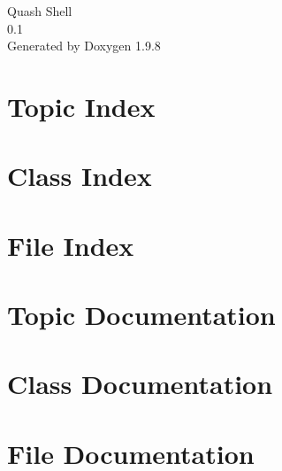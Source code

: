 \documentclass[twoside]{book}
\newcommand{\+}{\discretionary{\mbox{\scriptsize$\hookleftarrow$}}{}{}}
\newcommand{\clearemptydoublepage}{%
    \newpage{\pagestyle{empty}\cleardoublepage}%
  }
\begin{document}
  \raggedbottom
    \hypersetup{pageanchor=false,
                bookmarksnumbered=true,
                pdfencoding=unicode
               }
  \begin{titlepage}
  \vspace*{7cm}
  \begin{center}%
  {\Large Quash Shell}\\
  [1ex]\large 0.\+1 \\
  \vspace*{1cm}
  {\large Generated by Doxygen 1.9.8}\\
  \end{center}
  \end{titlepage}
  \clearemptydoublepage
  \tableofcontents
  \clearemptydoublepage
  \hypersetup{pageanchor=true}

\chapter{Topic Index}

\chapter{Class Index}

\chapter{File Index}

\chapter{Topic Documentation}

\chapter{Class Documentation}











\chapter{File Documentation}

















  \backmatter
  \newpage
  \clearemptydoublepage
  \printindex
\end{document}
